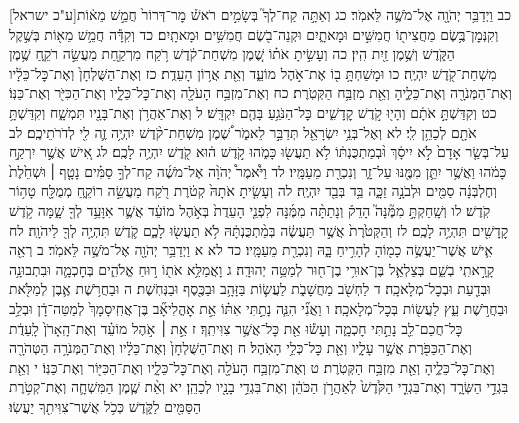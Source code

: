 \documentclass[twoside, openany, parskip=half, 11pt]{book}
\begin{document}
[ע"כ ישראל]כב וַיְדַבֵּ֥ר יְהֹוָ֖ה אֶל־מֹשֶׁ֥ה לֵּאמֹֽר׃ כג וְאַתָּ֣ה קַח־לְךָ֮ בְּשָׂמִ֣ים רֹאשׁ֒ מׇר־דְּרוֹר֙ חֲמֵ֣שׁ מֵא֔וֹת וְקִנְּמׇן־בֶּ֥שֶׂם מַחֲצִית֖וֹ חֲמִשִּׁ֣ים וּמָאתָ֑יִם וּקְנֵה־בֹ֖שֶׂם חֲמִשִּׁ֥ים וּמָאתָֽיִם׃ כד וְקִדָּ֕ה חֲמֵ֥שׁ מֵא֖וֹת בְּשֶׁ֣קֶל הַקֹּ֑דֶשׁ וְשֶׁ֥מֶן זַ֖יִת הִֽין׃ כה וְעָשִׂ֣יתָ אֹת֗וֹ שֶׁ֚מֶן מִשְׁחַת־קֹ֔דֶשׁ רֹ֥קַח מִרְקַ֖חַת מַעֲשֵׂ֣ה רֹקֵ֑חַ שֶׁ֥מֶן מִשְׁחַת־קֹ֖דֶשׁ יִהְיֶֽה׃ כו וּמָשַׁחְתָּ֥ ב֖וֹ אֶת־אֹ֣הֶל מוֹעֵ֑ד וְאֵ֖ת אֲר֥וֹן הָעֵדֻֽת׃ כז וְאֶת־הַשֻּׁלְחָן֙ וְאֶת־כׇּל־כֵּלָ֔יו וְאֶת־הַמְּנֹרָ֖ה וְאֶת־כֵּלֶ֑יהָ וְאֵ֖ת מִזְבַּ֥ח הַקְּטֹֽרֶת׃ כח וְאֶת־מִזְבַּ֥ח הָעֹלָ֖ה וְאֶת־כׇּל־כֵּלָ֑יו וְאֶת־הַכִּיֹּ֖ר וְאֶת־כַּנּֽוֹ׃ כט וְקִדַּשְׁתָּ֣ אֹתָ֔ם וְהָי֖וּ קֹ֣דֶשׁ קׇֽדָשִׁ֑ים כׇּל־הַנֹּגֵ֥עַ בָּהֶ֖ם יִקְדָּֽשׁ׃ ל וְאֶת־אַהֲרֹ֥ן וְאֶת־בָּנָ֖יו תִּמְשָׁ֑ח וְקִדַּשְׁתָּ֥ אֹתָ֖ם לְכַהֵ֥ן לִֽי׃ לא וְאֶל־בְּנֵ֥י יִשְׂרָאֵ֖ל תְּדַבֵּ֣ר לֵאמֹ֑ר שֶׁ֠מֶן מִשְׁחַת־קֹ֨דֶשׁ יִהְיֶ֥ה זֶ֛ה לִ֖י לְדֹרֹתֵיכֶֽם׃ לב עַל־בְּשַׂ֤ר אָדָם֙ לֹ֣א יִיסָ֔ךְ וּ֨בְמַתְכֻּנְתּ֔וֹ לֹ֥א תַעֲשׂ֖וּ כָּמֹ֑הוּ קֹ֣דֶשׁ ה֔וּא קֹ֖דֶשׁ יִהְיֶ֥ה לָכֶֽם׃ לג אִ֚ישׁ אֲשֶׁ֣ר יִרְקַ֣ח כָּמֹ֔הוּ וַאֲשֶׁ֥ר יִתֵּ֛ן מִמֶּ֖נּוּ עַל־זָ֑ר וְנִכְרַ֖ת מֵעַמָּֽיו׃
לד וַיֹּ֩אמֶר֩ יְהֹוָ֨ה אֶל־מֹשֶׁ֜ה קַח־לְךָ֣ סַמִּ֗ים נָטָ֤ף ׀ וּשְׁחֵ֙לֶת֙ וְחֶלְבְּנָ֔ה סַמִּ֖ים וּלְבֹנָ֣ה זַכָּ֑ה בַּ֥ד בְּבַ֖ד יִהְיֶֽה׃ לה וְעָשִׂ֤יתָ אֹתָהּ֙ קְטֹ֔רֶת רֹ֖קַח מַעֲשֵׂ֣ה רוֹקֵ֑חַ מְמֻלָּ֖ח טָה֥וֹר קֹֽדֶשׁ׃ לו וְשָֽׁחַקְתָּ֣ מִמֶּ֘נָּה֮ הָדֵק֒ וְנָתַתָּ֨ה מִמֶּ֜נָּה לִפְנֵ֤י הָעֵדֻת֙ בְּאֹ֣הֶל מוֹעֵ֔ד אֲשֶׁ֛ר אִוָּעֵ֥ד לְךָ֖ שָׁ֑מָּה קֹ֥דֶשׁ קׇֽדָשִׁ֖ים תִּהְיֶ֥ה לָכֶֽם׃ לז וְהַקְּטֹ֙רֶת֙ אֲשֶׁ֣ר תַּעֲשֶׂ֔ה בְּמַ֨תְכֻּנְתָּ֔הּ לֹ֥א תַעֲשׂ֖וּ לָכֶ֑ם קֹ֛דֶשׁ תִּהְיֶ֥ה לְךָ֖ לַיהֹוָֽה׃ לח אִ֛ישׁ אֲשֶׁר־יַעֲשֶׂ֥ה כָמ֖וֹהָ לְהָרִ֣יחַ בָּ֑הּ וְנִכְרַ֖ת מֵעַמָּֽיו׃
כד לא א וַיְדַבֵּ֥ר יְהֹוָ֖ה אֶל־מֹשֶׁ֥ה לֵּאמֹֽר׃ ב רְאֵ֖ה קָרָ֣אתִֽי בְשֵׁ֑ם בְּצַלְאֵ֛ל בֶּן־אוּרִ֥י בֶן־ח֖וּר לְמַטֵּ֥ה יְהוּדָֽה׃ ג וָאֲמַלֵּ֥א אֹת֖וֹ ר֣וּחַ אֱלֹהִ֑ים בְּחׇכְמָ֛ה וּבִתְבוּנָ֥ה וּבְדַ֖עַת וּבְכׇל־מְלָאכָֽה׃ ד לַחְשֹׁ֖ב מַחֲשָׁבֹ֑ת לַעֲשׂ֛וֹת בַּזָּהָ֥ב וּבַכֶּ֖סֶף וּבַנְּחֹֽשֶׁת׃ ה וּבַחֲרֹ֥שֶׁת אֶ֛בֶן לְמַלֹּ֖את וּבַחֲרֹ֣שֶׁת עֵ֑ץ לַעֲשׂ֖וֹת בְּכׇל־מְלָאכָֽה׃ ו וַאֲנִ֞י הִנֵּ֧ה נָתַ֣תִּי אִתּ֗וֹ אֵ֣ת אׇהֳלִיאָ֞ב בֶּן־אֲחִֽיסָמָךְ֙ לְמַטֵּה־דָ֔ן וּבְלֵ֥ב כׇּל־חֲכַם־לֵ֖ב נָתַ֣תִּי חׇכְמָ֑ה וְעָשׂ֕וּ אֵ֖ת כׇּל־אֲשֶׁ֥ר צִוִּיתִֽךָ׃ ז אֵ֣ת ׀ אֹ֣הֶל מוֹעֵ֗ד וְאֶת־הָֽאָרֹן֙ לָֽעֵדֻ֔ת וְאֶת־הַכַּפֹּ֖רֶת אֲשֶׁ֣ר עָלָ֑יו וְאֵ֖ת כׇּל־כְּלֵ֥י הָאֹֽהֶל׃ ח וְאֶת־הַשֻּׁלְחָן֙ וְאֶת־כֵּלָ֔יו וְאֶת־הַמְּנֹרָ֥ה הַטְּהֹרָ֖ה וְאֶת־כׇּל־כֵּלֶ֑יהָ וְאֵ֖ת מִזְבַּ֥ח הַקְּטֹֽרֶת׃ ט וְאֶת־מִזְבַּ֥ח הָעֹלָ֖ה וְאֶת־כׇּל־כֵּלָ֑יו וְאֶת־הַכִּיּ֖וֹר וְאֶת־כַּנּֽוֹ׃ י וְאֵ֖ת בִּגְדֵ֣י הַשְּׂרָ֑ד וְאֶת־בִּגְדֵ֤י הַקֹּ֙דֶשׁ֙ לְאַהֲרֹ֣ן הַכֹּהֵ֔ן וְאֶת־בִּגְדֵ֥י בָנָ֖יו לְכַהֵֽן׃ יא וְאֵ֨ת שֶׁ֧מֶן הַמִּשְׁחָ֛ה וְאֶת־קְטֹ֥רֶת הַסַּמִּ֖ים לַקֹּ֑דֶשׁ כְּכֹ֥ל אֲשֶׁר־צִוִּיתִ֖ךָ יַעֲשֽׂוּ׃
\end{document}
